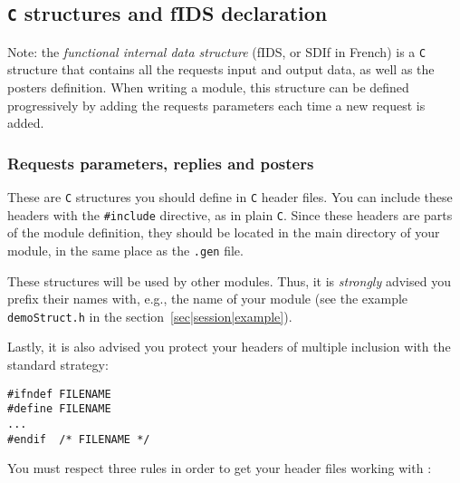 \subsection{{\tt C} structures and fIDS declaration}

Note:  the  {\em functional internal  data  structure} (fIDS, or  SDIf in
French) is  a {\tt C} structure that  contains all the requests input and
output data,  as well as the  posters definition.  When writing a module,
this structure   can  be defined  progressively  by   adding the requests
parameters each time a new request is added.

\subsubsection{Requests parameters, replies and posters}

These are {\tt  C} structures you should define  in {\tt C} header files.
You can include  these headers with the {\tt  \#include} directive, as in
plain {\tt C}.  Since these headers are parts  of the  module definition,
they should be located in the main directory  of your module, in the same
place as the {\tt .gen} file.

These structures  will  be  used by other   modules.   Thus, it  is  {\em
strongly} advised you prefix  their  names with,  e.g., the name  of your
module (see        the  example      {\tt    demoStruct.h}   in       the
section~\ref{sec|session|example}).

Lastly, it is also advised you protect your headers of multiple inclusion
with the standard strategy:

\begin{center}\begin{cartouche}\small\begin{verbatim}
#ifndef FILENAME
#define FILENAME
...
#endif  /* FILENAME */
\end{verbatim}\end{cartouche}\end{center}

You must respect three rules in order to get your header files working
with \GenoM:

